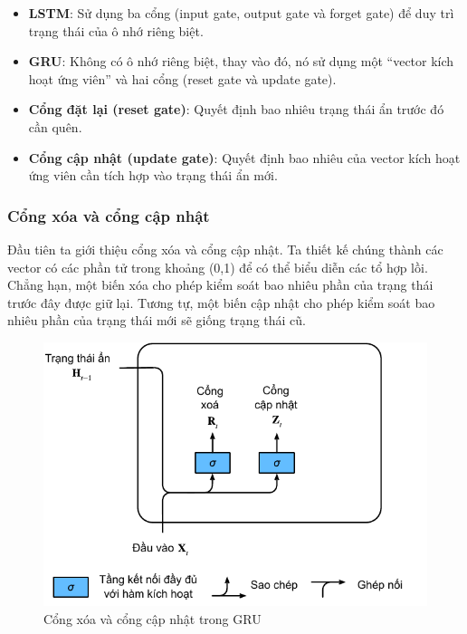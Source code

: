 \documentclass[conference]{IEEEtran}
\begin{document}
\begin{itemize}
    \item \textbf{LSTM}: Sử dụng ba cổng (input gate, output gate và forget gate) để duy trì trạng thái của ô nhớ riêng biệt.
    \item \textbf{GRU}: Không có ô nhớ riêng biệt, thay vào đó, nó sử dụng một “vector kích hoạt ứng viên” và hai cổng (reset gate và update gate).
\end{itemize}

\begin{itemize}
    \item \textbf{Cổng đặt lại (reset gate)}: Quyết định bao nhiêu trạng thái ẩn trước đó cần quên.
    \item \textbf{Cổng cập nhật (update gate)}: Quyết định bao nhiêu của vector kích hoạt ứng viên cần tích hợp vào trạng thái ẩn mới.
\end{itemize}

\subsubsection{Cổng xóa và cổng cập nhật}
Đầu tiên ta giới thiệu cổng xóa và cổng cập nhật. Ta thiết kế chúng thành các vector có các phần tử trong khoảng  (0,1)
để có thể biểu diễn các tổ hợp lồi. Chẳng hạn, một biến xóa cho phép kiểm soát bao nhiêu phần của trạng thái trước đây được giữ lại. Tương tự, một biến cập nhật cho phép kiểm soát bao nhiêu phần của trạng thái mới sẽ giống trạng thái cũ.


\begin{figure}[H]
    \centering
    \begin{minipage}{0.23\textwidth}
        \centering
        \includegraphics[width=1\textwidth]{bibliography/figure/GRU/gru_1.pdf}
        \caption{Cổng xóa và cổng cập nhật trong GRU}
        \label{fig:gru_del_up}
    \end{minipage}
\end{figure}
\end{document}
